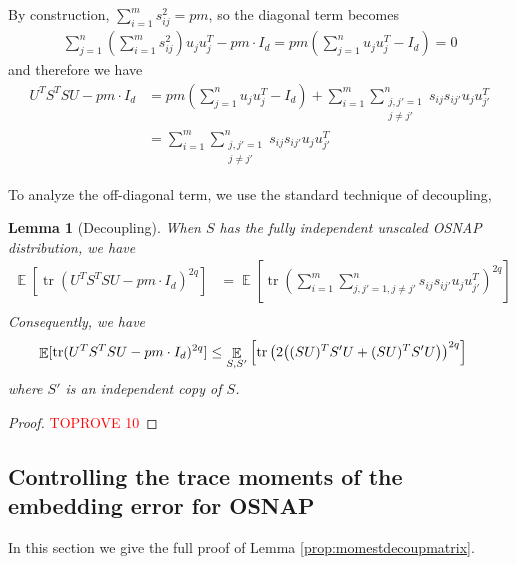 \documentclass[11pt]{amsart}
\numberwithin{equation}{section}
\numberwithin{equation}{section}
\DeclareMathOperator{\E}{\mathbb{E}}
\DeclareMathOperator*{\tr}{tr}
\DeclarePairedDelimiter{\paren}{(}{)}
\newtheorem{lemma}[theorem]{Lemma}
\theoremstyle{remark}
\theoremstyle{definition}
\begin{document}
By construction, $\sum_{i=1}^m s_{ij}^2 = pm$, so the diagonal term becomes
\begin{align*}
        \sum_{j=1}^n \left( \sum_{i=1}^m s_{ij}^2 \right) u_ju_j^T  - pm\cdot I_d=pm \left( \sum_{j=1}^n u_ju_j^T  - I_d \right)=0
    \end{align*}
and therefore we have
\begin{align*}
    U^TS^TSU - pm\cdot I_d &=  pm \left( \sum_{j=1}^n u_ju_j^T  - I_d \right) + \sum_{i=1}^m \sum_{\substack{j,j' =1 \\ j \neq j'}}^n s_{ij}s_{ij'} u_ju_{j'}^T \\
    &= \sum_{i=1}^m \sum_{\substack{j,j' =1 \\ j \neq j'}}^n s_{ij}s_{ij'} u_ju_{j'}^T
\end{align*}

To analyze the off-diagonal term, we use the standard technique of decoupling, 



\begin{lemma}[Decoupling] \label{lem:decoup}
When $S$ has the fully independent unscaled OSNAP distribution, we have
\begin{align*}
    \E [ \tr (U^TS^TSU - pm\cdot I_d)^{2q} ] &= \E \left[ \tr \left( \sum_{i=1}^m \sum_{j,j' =1, j \neq j'}^n s_{ij}s_{ij'} u_ju_{j'}^T \right)^{2q} \right] \\
\end{align*}
Consequently, we have
\begin{align*}
    \E [ \tr (U^TS^TSU - pm\cdot I_d)^{2q} ] &\le \E_{S,S'} \left[ \tr \left(  2\paren*{(SU)^TS'U + (SU)^TS'U} \right)^{2q} \right]
\end{align*}
where $S'$ is an independent copy of $S$.
\end{lemma}



\begin{proof}\textcolor{red}{TOPROVE 10}\end{proof}

\subsection{Controlling the trace moments of the embedding error for OSNAP} \label{subsec:osnaptracemom}
In this section we give the full proof of Lemma \ref{prop:momestdecoupmatrix}.
\end{document}
